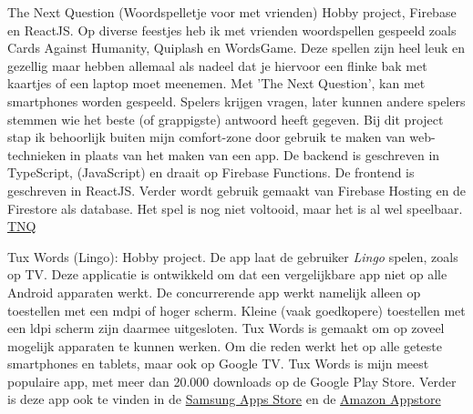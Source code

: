 \documentclass[10pt,a4paper]{article}
\begin{document}

\inlineheadsection
{The Next Question (Woordspelletje voor met vrienden)}
{Hobby project, Firebase en ReactJS. Op diverse feestjes heb ik met vrienden woordspellen gespeeld zoals Cards Against Humanity, Quiplash en WordsGame. Deze spellen zijn heel leuk en gezellig maar hebben allemaal als nadeel dat je hiervoor een flinke bak met kaartjes of een laptop moet meenemen. Met 'The Next Question', kan met smartphones worden gespeeld. Spelers krijgen vragen, later kunnen andere spelers stemmen wie het beste (of grappigste) antwoord heeft gegeven. Bij dit project stap ik behoorlijk buiten mijn comfort-zone door gebruik te maken van web-technieken in plaats van het maken van een app. De backend is geschreven in TypeScript, (JavaScript) en draait op Firebase Functions. De frontend is geschreven in ReactJS. Verder wordt gebruik gemaakt van Firebase Hosting en de Firestore als database. Het spel is nog niet voltooid, maar het is al wel speelbaar. \href{https://frankkienl-tnq.firebaseapp.com/}{TNQ}
}

\inlineheadsection
{Tux Words (Lingo):}
{Hobby project. De app laat de gebruiker \emph{Lingo} spelen, zoals op TV. Deze applicatie is ontwikkeld om dat een vergelijkbare app niet op alle Android apparaten werkt. De concurrerende app werkt namelijk alleen op toestellen met een mdpi of hoger scherm. Kleine (vaak goedkopere) toestellen met een ldpi scherm zijn daarmee uitgesloten. Tux Words is gemaakt om op zoveel mogelijk apparaten te kunnen werken. Om die reden werkt het op alle geteste smartphones en tablets, maar ook op Google TV. Tux Words is mijn meest populaire app, met meer dan 20.000 downloads op de Google Play Store. Verder is deze app ook te vinden in de \href{http://apps.samsung.com/venus/topApps/topAppsDetail.as?productId=000000498917}{Samsung Apps Store} en de \href{http://www.amazon.com/FrankkieNL-Tux-Words-Lingo/dp/B0096M4AYU/}{Amazon Appstore}}
\end{document}

